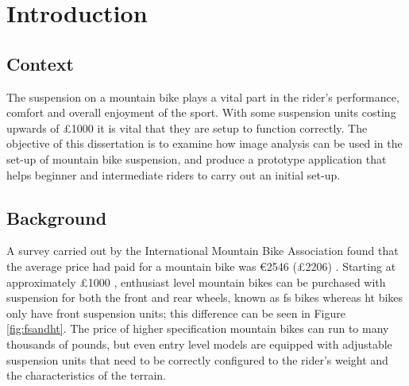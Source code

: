 \section{Introduction}\label{sec:introduction}
\subsection{Context}
	The suspension on a mountain bike plays a vital part in the rider's performance, comfort and overall enjoyment of the sport. With some suspension units costing upwards of \pounds1000 it is vital that they are setup to function correctly. The objective of this dissertation is to examine how image analysis can be used in the set-up of mountain bike suspension, and produce a prototype application that helps beginner and intermediate riders to carry out an initial set-up.
\subsection{Background}
	A survey carried out by the International Mountain Bike Association found that the average price had paid for a mountain bike was \euro2546 (\pounds2206) \citep{imbasurv}. Starting at approximately \pounds1000 \citep{giantstance}, enthusiast level mountain bikes can be purchased with suspension for both the front and rear wheels, known as \gls{fs} bikes whereas \gls{ht} bikes only have front suspension units; this difference can be seen in Figure \ref{fig:fsandht}. The price of higher specification mountain bikes can run to many thousands of pounds, but even entry level models are equipped with adjustable suspension units that need to be correctly configured to the rider's weight and the characteristics of the terrain.
